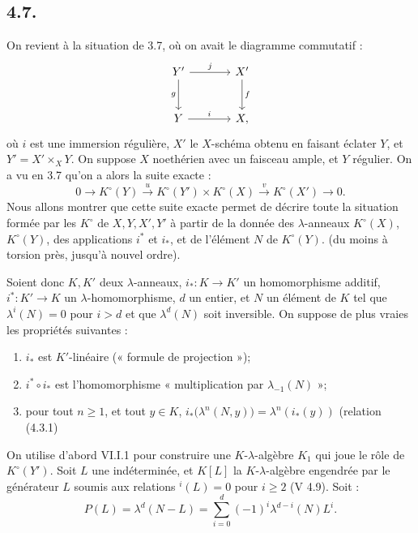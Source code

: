\subsection*{4.7.}

On
revient à la situation de 3.7, où on avait le diagramme commutatif :
\[
\begin{tikzcd}[column sep=large,row sep=large]
Y' \arrow[r,"j"] \arrow[d,"g"'] & X' \arrow[d,"f"]\\
Y \arrow[r,"i"] & X,
\end{tikzcd}
\]
où \(i\) est une immersion régulière, \(X'\) le \(X\)-schéma obtenu en faisant éclater \(Y\), et \(Y'=X'\times_XY\). On suppose \(X\) noethérien avec un faisceau ample, et \(Y\) régulier. On a vu en 3.7 qu'on a alors la suite exacte :
\[
0\longrightarrow K^\circ(Y)\xrightarrow{u}
K^\circ(Y')\times K^\circ(X)\xrightarrow{v}
K^\circ(X')\longrightarrow0.
\]
Nous allons montrer que cette suite exacte permet de décrire toute la situation formée par les \(K^\circ\) de \(X,Y,X',Y'\) à partir de la donnée des \(\lambda\)-anneaux \(K^\circ(X)\), \(K^\circ(Y)\), des applications \(i^*\) et \(i_*\), et de l'élément \(N\) de \(K^\circ(Y)\). (du moins à torsion près, jusqu'à nouvel ordre).

Soient donc \(K,K'\) deux \(\lambda\)-anneaux, \(i_*:K\to K'\) un homomorphisme additif, \(i^*:K'\to K\) un \(\lambda\)-homomorphisme, \(d\) un entier, et \(N\) un élément de \(K\) tel que \(\lambda^i(N)=0\) pour \(i>d\) et que \(\lambda^d(N)\) soit inversible. On suppose de plus vraies les propriétés suivantes :
\begin{enumerate}[label=\roman*)]
\item \(i_*\) est \(K'\)-linéaire (« formule de projection »);
\item \(i^*\circ i_*\) est l'homomorphisme « multiplication par \(\lambda_{-1}(N)\) »;
\item pour tout \(n\ge1\), et tout \(y\in K\), \(i_*\bigl(\lambda^n(N,y)\bigr)=\lambda^n(i_*(y))\) (relation (4.3.1)
\end{enumerate}

On utilise d'abord VI.I.1 pour construire une \(K\)-\(\lambda\)-algèbre \(K_1\) qui joue le rôle de \(K^\circ(Y')\). Soit \(L\) une indéterminée, et \(K[L]\) la \(K\)-\(\lambda\)-algèbre engendrée par le générateur \(L\) soumis aux relations \({}^i(L)=0\) pour \(i\ge2\) (V 4.9). Soit :
\[
  P(L)=\lambda^d(N-L)=\sum_{i=0}^{d}(-1)^i\lambda^{d-i}(N)L^i.
\]
